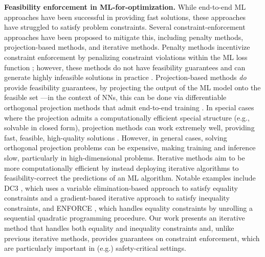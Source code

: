 \documentclass{article}
\begin{document}
\textbf{Feasibility enforcement in ML-for-optimization.} While end-to-end ML approaches have been successful in 
providing fast solutions,
these approaches have struggled to satisfy problem constraints.
Several constraint-enforcement approaches have been proposed to mitigate this, 
including penalty methods, projection-based methods, and iterative methods. 
Penalty methods 
incentivize
constraint enforcement by penalizing constraint violations within the ML loss function \cite{fioretto2021lagrangian, park2023self}; however, these methods do not have feasibility guarantees and can generate highly infeasible solutions in practice \cite{donti2021dc3,park2023self, park2023compact}. 
Projection-based methods
\emph{do}
provide feasibility guarantees, by projecting the output of the ML model onto the feasible set \cite{min2024hard, huang2021differentiable}---in the context of 
NNs,
this can be done via differentiable orthogonal projection methods that admit end-to-end training \cite{min2024hard, amos2017optnet, cvxpylayers2019}.
In special cases where the projection admits a computationally efficient special structure (e.g., 
solvable in closed form), projection methods can work extremely well, providing fast, feasible, high-quality solutions \cite{tanneau2024dual, konstantinov2023new, tordesillas2023rayen}.
However, in general cases, solving orthogonal projection problems can be expensive, making training and inference 
slow, particularly in high-dimensional problems.
Iterative methods aim to be more computationally efficient by instead deploying iterative algorithms to feasibility-correct the predictions of an ML algorithm. %
Notable examples include DC3 \cite{donti2021dc3}, which uses a variable elimination-based approach to satisfy equality constraints and a gradient-based iterative approach to satisfy inequality constraints, and ENFORCE \cite{lastrucci2025enforce}, which handles equality constraints by unrolling a sequential quadratic programming procedure.
Our work presents an iterative method that handles both equality and inequality constraints and, unlike previous iterative methods, provides guarantees on constraint enforcement, which are particularly important in (e.g.) safety-critical settings.
\end{document}
